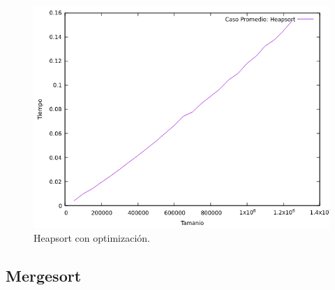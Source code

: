 \documentclass[a4paper,12pt,twoside]{article} %
\begin{document}
\begin{itemize}
\begin{figure}[h]
\begin{center}
  	\includegraphics[scale=0.8]{heapsort_me_co.png}
  	\caption{Heapsort con optimización.}
  	
  \end{center}
\end{figure}
	
\end{itemize}
\newpage
	
	\subsection{Mergesort}
	
\end{document}
